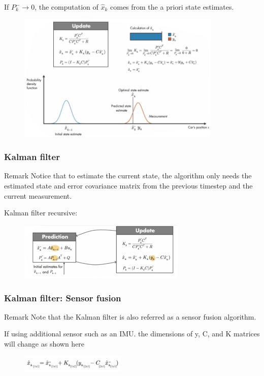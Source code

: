 \documentclass{beamer}
\begin{document}
\begin{frame}
	If $P^-_k  \to 0 $, the computation of $\hat{x}_{k} $ comes from the a priori state estimates.
	\begin{figure}
		\centering
		\includegraphics[width=9.7cm]{kf_gain_P0.png}
	\end{figure}
\end{frame}

\begin{frame}
	\frametitle{Kalman filter}
	\begin{block}{Remark}
		Notice that to estimate the current state, the algorithm only needs the estimated state and error covariance matrix from the previous timestep and the current measurement.
	\end{block}
	Kalman filter recursive:
	\begin{figure}
		\centering
		\includegraphics[width=8cm]{kf_loop.png}
	\end{figure}
\end{frame}

\begin{frame}
	\frametitle{Kalman filter: Sensor fusion}
	\begin{block}{Remark}
		Note that the Kalman filter is also referred as a sensor fusion algorithm. 
	\end{block}
If using additional sensor such as an IMU.  the dimensions of y, C, and K matrices will change as shown here
	\begin{figure}
		\centering
		\includegraphics[width=5cm]{kf_multi_sensor.png}
	\end{figure}
\end{frame}
\end{document}
